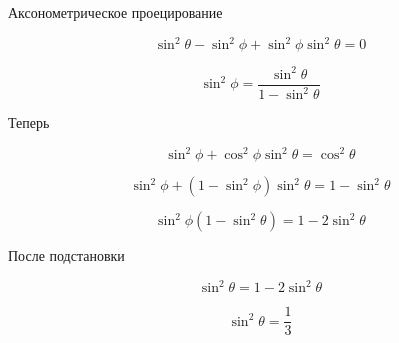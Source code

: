 \documentclass{beamer}
\begin{document}
\begin{frame}{Аксонометрическое проецирование}
{{			\[
				\sin^2 \theta - \sin^2 \phi + \sin^2 \phi \sin^2 \theta = 0
			\]

			\[
				\sin^2 \phi  = \frac{\sin^2 \theta}{1 - \sin^2 \theta}
			\]

			Теперь

			\[
				\sin^2 \phi +  \cos^2 \phi \sin^2 \theta = \cos^2 \theta 
			\]


			\[
				\sin^2 \phi + (1 - \sin^2 \phi) \sin^2 \theta = 1 - \sin^2 \theta
			\]

			\[
				\sin^2 \phi (1 - \sin^2 \theta)  = 1 - 2 \sin^2 \theta
			\]

			После подстановки

			\[
				\sin^2 \theta  = 1 - 2 \sin^2 \theta
			\]

			\[
				\sin^2 \theta  = \frac{1}{3}
			\]
		}
		}
	\end{frame}
\end{document}
